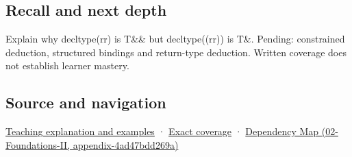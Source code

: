 \subsection{Recall and next depth}\label{recall-and-next-depth}

Explain why decltype(rr) is T\&\& but decltype((rr)) is T\&. Pending: constrained deduction, structured bindings and return-type deduction. Written coverage does not establish learner mastery.

\subsection{Source and navigation}\label{source-and-navigation}

\href{Continuous\%20Notes/Computing\%20Foundations\%20-\%20From\%20Bits\%20to\%20C++\%20and\%20Systems\%20APIs\#An\%20expression\%20has\%20a\%20type\%20and\%20a\%20category}{Teaching explanation and examples} · \hyperref[appendix-fd090d982a15]{Exact coverage} · \href{}{Dependency Map (02-Foundations-II, appendix-4ad47bdd269a)}
